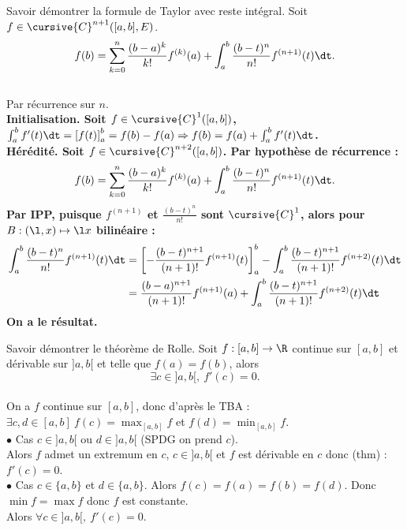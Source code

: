 \documentclass[french, 11pt]{article}
\begin{document}
\begin{exercice}{}{}
    Savoir démontrer la formule de Taylor avec reste intégral.
    \tcblower
    Soit $f\in\cursive{C}^{n+1}([a,b],E)$.
    \begin{equation*}
        f(b) = \sum_{k=0}^n\frac{(b-a)^k}{k!}f^{(k)}(a) + \int_a^b\frac{(b-t)^n}{n!}f^{(n+1)}(t)\dt.
    \end{equation*}
    \\
    Par récurrence sur $n$.\\
    \bf{Initialisation.} Soit $f\in\cursive{C}^1([a,b])$, $\int_a^b f'(t)\dt = \left[ f(t) \right]_a^b = f(b) - f(a) \Rightarrow f(b) = f(a) + \int_a^b f'(t)\dt$.\\
    \bf{Hérédité.} Soit $f\in\cursive{C}^{n+2}([a,b])$. Par hypothèse de récurrence :
    \begin{align*}
        f(b) = \sum_{k=0}^n \frac{(b-a)^k}{k!}f^{(k)}(a) + \int_a^b\frac{(b-t)^n}{n!}f^{(n+1)}(t)\dt.
    \end{align*}
    Par IPP, puisque $f^{(n+1)}$ et $\frac{(b-t)^n}{n!}$ sont $\cursive{C}^1$, alors pour $B:(\l,x)\mapsto \l x$ bilinéaire :
    \begin{align*}
        \int_a^b \frac{(b-t)^n}{n!}f^{(n+1)}(t)\dt &= \left[ - \frac{(b-t)^{n+1}}{(n+1)!} f^{(n+1)}(t)\right]_a^b - \int_a^b\frac{(b-t)^{n+1}}{(n+1)!}f^{(n+2)}(t)\dt\\
        &=\frac{(b-a)^{n+1}}{(n+1)!}f^{(n+1)}(a) + \int_a^b\frac{(b-t)^{n+1}}{(n+1)!}f^{(n+2)}(t)\dt
    \end{align*}
    On a le résultat.
\end{exercice}

\begin{exercice}{}{}
    Savoir démontrer le théorème de Rolle.
    \tcblower
    Soit $f:[a,b]\to\R$ continue sur $[a,b]$ et dérivable sur $]a,b[$ et telle que $f(a)=f(b)$, alors
    \begin{equation*}
        \exists c \in ]a,b[, ~ f'(c)=0.
    \end{equation*}
    \\
    On a $f$ continue sur $[a,b]$, donc d'après le TBA : $\exists c,d \in[a,b] ~ f(c)=\max_{[a,b]} f$ et $f(d)=\min_{[a,b]} f$.\\
    $\bullet$ Cas $c\in]a,b[$ ou $d\in]a,b[$ (SPDG on prend $c$).\\
    Alors $f$ admet un extremum en $c$, $c\in]a,b[$ et $f$ est dérivable en $c$ donc (thm) : $f'(c)=0$.\\
    $\bullet$ Cas $c\in\{a,b\}$ et $d\in\{a,b\}$. Alors $f(c)=f(a)=f(b)=f(d)$. Donc $\min f = \max f$ donc $f$ est constante.\\
    Alors $\forall c \in ]a,b[, ~ f'(c)=0$.
\end{exercice}
\end{document}

